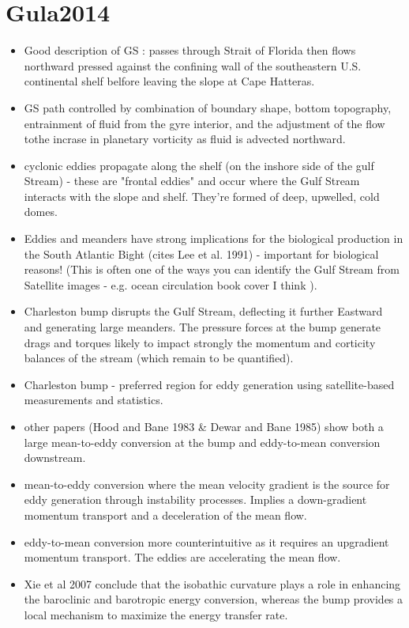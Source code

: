 \documentclass[..\Papers.tex]{subfiles}
\begin{document}
\section{Gula2014}
\citep{Gula2014}


\begin{itemize}
    \item Good description of GS : passes through Strait of Florida then flows northward pressed against the confining wall of the southeastern U.S. continental shelf belfore leaving the slope at Cape Hatteras.
    \item GS path controlled by combination of boundary shape, bottom topography, entrainment of fluid from the gyre interior, and the adjustment of the flow tothe incrase in planetary vorticity as fluid is advected northward.
    \item cyclonic eddies propagate along the shelf (on the inshore side of the gulf Stream) - these are "frontal eddies" and occur where the Gulf Stream interacts with the slope and shelf. They're formed of deep, upwelled, cold domes.
    \item Eddies and meanders have strong implications for the biological production in the South Atlantic Bight (cites Lee et al. 1991) - important for biological reasons! (This is often one of the ways you can identify the Gulf Stream from Satellite images - e.g. ocean circulation book cover I think ).
    \item Charleston bump disrupts the Gulf Stream, deflecting it further Eastward and generating large meanders. The pressure forces at the bump generate drags and torques likely to impact strongly the momentum and corticity balances of the stream (which remain to be quantified).
    \item Charleston bump - preferred region for eddy generation using satellite-based measurements and statistics.
    \item other papers (Hood and Bane 1983 \& Dewar and Bane 1985) show both a large mean-to-eddy conversion at the bump and eddy-to-mean conversion downstream.
    \item mean-to-eddy conversion where the mean velocity gradient is the source for eddy generation through instability processes. Implies a down-gradient momentum transport and a deceleration of the mean flow.
    \item eddy-to-mean conversion more counterintuitive as it requires an upgradient momentum transport. The eddies are accelerating the mean flow.
    \item Xie et al 2007 conclude that the isobathic curvature plays a role in enhancing the baroclinic and barotropic energy conversion, whereas the bump provides a local mechanism to maximize the energy transfer rate. 

\end{itemize}
\end{document}
